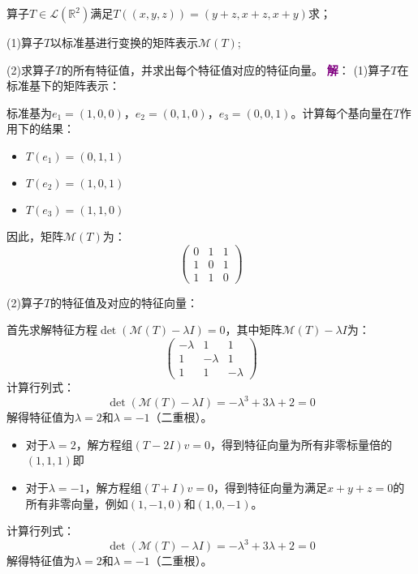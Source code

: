 \begin{example}
	算子$T\in\mathcal{L}(\mathbb{R}^2)$满足$T((x,y,z))=(y+z, x+z, x+y)$求；

	(1)算子$T$以标准基进行变换的矩阵表示$\mathcal{M}(T)$;

	(2)求算子$T$的所有特征值，并求出每个特征值对应的特征向量。
	\tcblower
	\textcolor{purple}{\textbf{解}}： 
	(1)算子$T$在标准基下的矩阵表示：
	
	标准基为$e_1 = (1, 0, 0)$，$e_2 = (0, 1, 0)$，$e_3 = (0, 0, 1)$。计算每个基向量在$T$作用下的结果：
	\begin{itemize}
		\item $T(e_1) = (0, 1, 1)$
		\item $T(e_2) = (1, 0, 1)$
		\item $T(e_3) = (1, 1, 0)$
	\end{itemize}
	因此，矩阵$\mathcal{M}(T)$为：$$\begin{pmatrix} 0 & 1 & 1 \\ 1 & 0 & 1 \\ 1 & 1 & 0 \end{pmatrix}$$

	(2)算子$T$的特征值及对应的特征向量：

	首先求解特征方程$\det(\mathcal{M}(T) - \lambda I) = 0$，其中矩阵$\mathcal{M}(T) - \lambda I$为：$$\begin{pmatrix} -\lambda & 1 & 1 \\ 1 & -\lambda & 1 \\ 1 & 1 & -\lambda \end{pmatrix}$$
	计算行列式：$$\det(\mathcal{M}(T) - \lambda I) = -\lambda^3 + 3\lambda + 2 = 0$$
	解得特征值为$\lambda = 2$和$\lambda = -1$（二重根）。
	\begin{itemize}
		\item 对于$\lambda = 2$，解方程组$(T - 2I)v = 0$，得到特征向量为所有非零标量倍的$(1, 1, 1)$即
		\item 对于$\lambda = -1$，解方程组$(T + I)v = 0$，得到特征向量为满足$x + y + z = 0$的所有非零向量，例如$(1, -1, 0)$和$(1, 0, -1)$。
	\end{itemize}
	计算行列式：$$\det(\mathcal{M}(T) - \lambda I) = -\lambda^3 + 3\lambda + 2 = 0$$解得特征值为$\lambda = 2$和$\lambda = -1$（二重根）。


\end{example}
